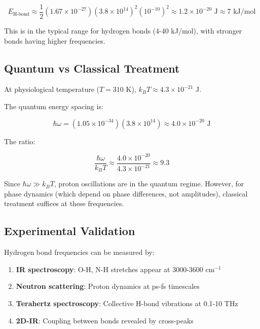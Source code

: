 \begin{equation}
E_{\text{H-bond}} \approx \frac{1}{2}(1.67 \times 10^{-27})(3.8 \times 10^{14})^2(10^{-10})^2 \approx 1.2 \times 10^{-20} \text{ J} \approx 7 \text{ kJ/mol}
\end{equation}

This is in the typical range for hydrogen bonds (4-40 kJ/mol), with stronger bonds having higher frequencies.

\subsection{Quantum vs Classical Treatment}

At physiological temperature ($T = 310$ K), $k_B T \approx 4.3 \times 10^{-21}$ J.

The quantum energy spacing is:

\begin{equation}
\hbar\omega = (1.05 \times 10^{-34})(3.8 \times 10^{14}) \approx 4.0 \times 10^{-20} \text{ J}
\end{equation}

The ratio:

\begin{equation}
\frac{\hbar\omega}{k_B T} \approx \frac{4.0 \times 10^{-20}}{4.3 \times 10^{-21}} \approx 9.3
\end{equation}

Since $\hbar\omega \gg k_B T$, proton oscillations are in the quantum regime. However, for phase dynamics (which depend on phase differences, not amplitudes), classical treatment suffices at these frequencies.

\subsection{Experimental Validation}

Hydrogen bond frequencies can be measured by:

\begin{enumerate}
\item \textbf{IR spectroscopy}: O-H, N-H stretches appear at 3000-3600 cm$^{-1}$
\item \textbf{Neutron scattering}: Proton dynamics at ps-fs timescales
\item \textbf{Terahertz spectroscopy}: Collective H-bond vibrations at 0.1-10 THz
\item \textbf{2D-IR}: Coupling between bonds revealed by cross-peaks
\end{enumerate}

